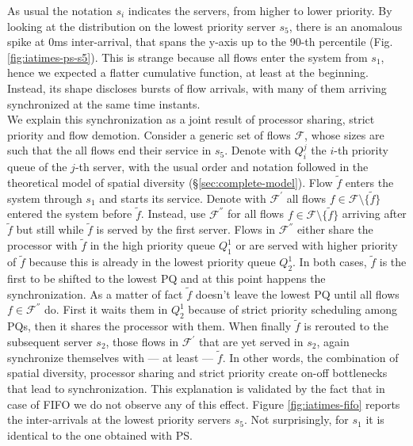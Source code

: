 As usual the notation $s_i$ indicates the servers, from higher to lower priority. By looking at the distribution on the lowest priority server $s_5$, there is an anomalous spike at 0ms inter-arrival, that spans the y-axis up to the 90-th percentile (Fig.\ref{fig:iatimes-ps-s5}). This is strange because all flows enter the system from $s_1$, hence we expected a flatter cumulative function, at least at the beginning. Instead, its shape discloses bursts of flow arrivals, with many of them arriving synchronized at the same time instants. \\
We explain this synchronization as a joint result of processor sharing, strict priority and flow demotion. Consider a generic set of flows $\mathcal{F}$, whose sizes are such that the all flows end their service in $s_5$. Denote with $Q_i^j$ the $i$-th priority queue of the $j$-th server, with the usual order and notation followed in the theoretical model of spatial diversity (\S \ref{sec:complete-model}). Flow $\tilde{f}$ enters the system through $s_1$ and starts its service. Denote with $\mathcal{F}^\prime$  all flows $f \in \mathcal{F} \setminus \{\tilde{f}\}$ entered the system before $\tilde{f}$. Instead, use $\mathcal{F}^{\dprime}$ for all flows $f \in \mathcal{F} \setminus \{\tilde{f}\}$ arriving after $\tilde{f}$ but still while $\tilde{f}$ is served by the first server. Flows in $\mathcal{F}^{\dprime}$ either share the processor with $\tilde{f}$ in the high priority queue $Q_1^1$ or are served with higher priority of $\tilde{f}$ because this is already in the lowest priority queue $Q_2^1$.  In both cases, $\tilde{f}$ is the first to be shifted to the lowest PQ and at this point happens the synchronization. As a matter of fact $\tilde{f}$ doesn't leave the lowest PQ until all flows $f \in \mathcal{F}^{\dprime}$ do. First it waits them in $Q_2^1$ because of strict priority scheduling among PQs, then it shares the processor with them. When finally $\tilde{f}$ is rerouted to the subsequent server $s_2$, those flows in $\mathcal{F}^\prime$ that are yet served in $s_2$, again synchronize themselves with --- at least --- $\tilde{f}$.  In other words, the combination of spatial diversity, processor sharing and strict priority create on-off bottlenecks that lead to synchronization. This explanation is validated by the fact that in case of FIFO we do not observe any of this effect. Figure \ref{fig:iatimes-fifo} reports the inter-arrivals at the lowest priority servers $s_5$. Not surprisingly, for $s_1$ it is identical to the one obtained with PS.
